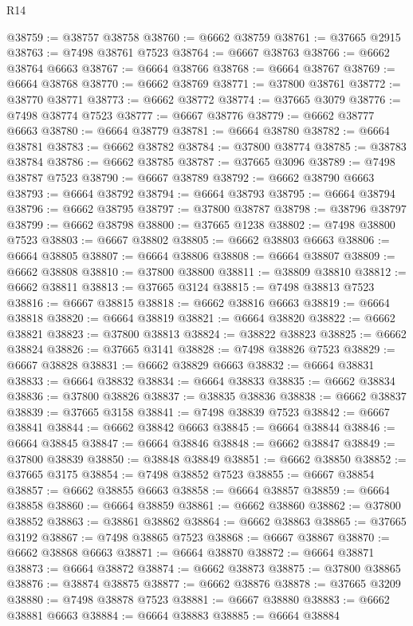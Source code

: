 \begin{lexlean}{R14}
\begin{coremodule}
@38759 := @38757 @38758
@38760 := @6662 @38759
@38761 := @37665 @2915
@38763 := @7498 @38761 @7523
@38764 := @6667 @38763
@38766 := @6662 @38764 @6663
@38767 := @6664 @38766
@38768 := @6664 @38767
@38769 := @6664 @38768
@38770 := @6662 @38769
@38771 := @37800 @38761
@38772 := @38770 @38771
@38773 := @6662 @38772
@38774 := @37665 @3079
@38776 := @7498 @38774 @7523
@38777 := @6667 @38776
@38779 := @6662 @38777 @6663
@38780 := @6664 @38779
@38781 := @6664 @38780
@38782 := @6664 @38781
@38783 := @6662 @38782
@38784 := @37800 @38774
@38785 := @38783 @38784
@38786 := @6662 @38785
@38787 := @37665 @3096
@38789 := @7498 @38787 @7523
@38790 := @6667 @38789
@38792 := @6662 @38790 @6663
@38793 := @6664 @38792
@38794 := @6664 @38793
@38795 := @6664 @38794
@38796 := @6662 @38795
@38797 := @37800 @38787
@38798 := @38796 @38797
@38799 := @6662 @38798
@38800 := @37665 @1238
@38802 := @7498 @38800 @7523
@38803 := @6667 @38802
@38805 := @6662 @38803 @6663
@38806 := @6664 @38805
@38807 := @6664 @38806
@38808 := @6664 @38807
@38809 := @6662 @38808
@38810 := @37800 @38800
@38811 := @38809 @38810
@38812 := @6662 @38811
@38813 := @37665 @3124
@38815 := @7498 @38813 @7523
@38816 := @6667 @38815
@38818 := @6662 @38816 @6663
@38819 := @6664 @38818
@38820 := @6664 @38819
@38821 := @6664 @38820
@38822 := @6662 @38821
@38823 := @37800 @38813
@38824 := @38822 @38823
@38825 := @6662 @38824
@38826 := @37665 @3141
@38828 := @7498 @38826 @7523
@38829 := @6667 @38828
@38831 := @6662 @38829 @6663
@38832 := @6664 @38831
@38833 := @6664 @38832
@38834 := @6664 @38833
@38835 := @6662 @38834
@38836 := @37800 @38826
@38837 := @38835 @38836
@38838 := @6662 @38837
@38839 := @37665 @3158
@38841 := @7498 @38839 @7523
@38842 := @6667 @38841
@38844 := @6662 @38842 @6663
@38845 := @6664 @38844
@38846 := @6664 @38845
@38847 := @6664 @38846
@38848 := @6662 @38847
@38849 := @37800 @38839
@38850 := @38848 @38849
@38851 := @6662 @38850
@38852 := @37665 @3175
@38854 := @7498 @38852 @7523
@38855 := @6667 @38854
@38857 := @6662 @38855 @6663
@38858 := @6664 @38857
@38859 := @6664 @38858
@38860 := @6664 @38859
@38861 := @6662 @38860
@38862 := @37800 @38852
@38863 := @38861 @38862
@38864 := @6662 @38863
@38865 := @37665 @3192
@38867 := @7498 @38865 @7523
@38868 := @6667 @38867
@38870 := @6662 @38868 @6663
@38871 := @6664 @38870
@38872 := @6664 @38871
@38873 := @6664 @38872
@38874 := @6662 @38873
@38875 := @37800 @38865
@38876 := @38874 @38875
@38877 := @6662 @38876
@38878 := @37665 @3209
@38880 := @7498 @38878 @7523
@38881 := @6667 @38880
@38883 := @6662 @38881 @6663
@38884 := @6664 @38883
@38885 := @6664 @38884

\end{coremodule}
\end{lexlean}
